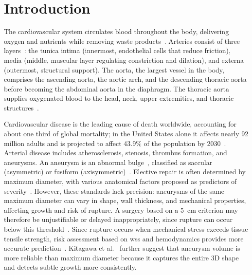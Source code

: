 \documentclass[12pt,a4paper]{article}
\newcommand{\WSS}{\ac{wss}\xspace}
\theoremstyle{definition}
\numberwithin{equation}{section}
\begin{document}
\section{Introduction}
\label{sec:introduction}

The cardiovascular system circulates blood throughout the body, delivering oxygen and nutrients while removing waste products~\cite{heymans1960reflexogenic}. Arteries consist of three layers~\cite{holzapfel2010modelling}: the tunica intima (innermost, endothelial cells that reduce friction), media (middle, muscular layer regulating constriction and dilation), and externa (outermost, structural support). The aorta, the largest vessel in the body, comprises the ascending aorta, the aortic arch, and the descending thoracic aorta before becoming the abdominal aorta in the diaphragm. The thoracic aorta supplies oxygenated blood to the head, neck, upper extremities, and thoracic structures~\cite{tran2018anatomy}.

Cardiovascular disease is the leading cause of death worldwide, accounting for about one third of global mortality; in the United States alone it affects nearly 92 million adults and is projected to affect 43.9\% of the population by 2030~\cite{Randles_CFD_2017}. Arterial disease includes atherosclerosis, stenosis, thrombus formation, and aneurysms. An aneurysm is an abnormal bulge~\cite{Les_et_al_2010}, classified as saccular (asymmetric) or fusiform (axisymmetric)~\cite{sakalihasan2018abdominal}. Elective repair is often determined by maximum diameter, with various anatomical factors proposed as predictors of severity~\cite{cronenwett1990variables, lipp2020computational}. However, these standards lack precision: aneurysms of the same maximum diameter can vary in shape, wall thickness, and mechanical properties, affecting growth and risk of rupture. A surgery based on a 5~cm criterion may therefore be unjustifiable or delayed inappropriately, since rupture can occur below this threshold~\cite{darling1977autopsy, belkacemi2022flow}. Since rupture occurs when mechanical stress exceeds tissue tensile strength, risk assessment based on \WSS and hemodynamics provides more accurate prediction~\cite{bilgi2020effects, vorp1998mechanical}. Kitagawa et al.~\cite{kitagawa2013role} further suggest that aneurysm volume is more reliable than maximum diameter because it captures the entire 3D shape and detects subtle growth more consistently.
\end{document}
